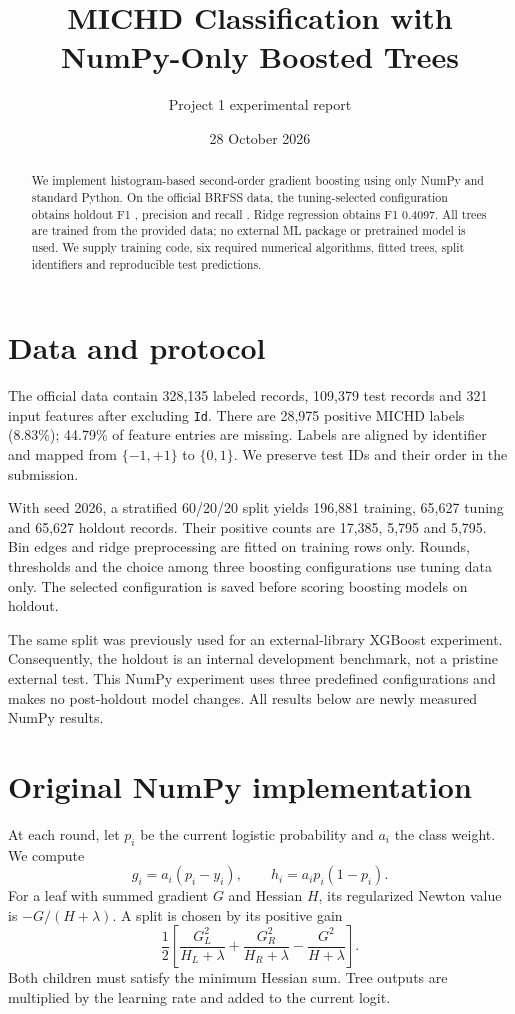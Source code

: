 \documentclass[10pt,a4paper]{article}
\title{\vspace{-1cm}MICHD Classification with NumPy-Only Boosted Trees}
\author{Project 1 experimental report}
\date{28 October 2026}
\begin{document}
\maketitle
\vspace{-0.5cm}
\begin{abstract}
We implement histogram-based second-order gradient boosting using only NumPy and standard Python. On the official BRFSS data, the tuning-selected configuration obtains holdout F1 \HoldF{}, precision \HoldP{} and recall \HoldR{}. Ridge regression obtains F1 0.4097. All trees are trained from the provided data; no external ML package or pretrained model is used. We supply training code, six required numerical algorithms, fitted trees, split identifiers and reproducible test predictions.
\end{abstract}

\section{Data and protocol}
The official data contain 328,135 labeled records, 109,379 test records and 321 input features after excluding \texttt{Id}. There are 28,975 positive MICHD labels (8.83\%); 44.79\% of feature entries are missing. Labels are aligned by identifier and mapped from $\{-1,+1\}$ to $\{0,1\}$. We preserve test IDs and their order in the submission.

With seed 2026, a stratified 60/20/20 split yields 196,881 training, 65,627 tuning and 65,627 holdout records. Their positive counts are 17,385, 5,795 and 5,795. Bin edges and ridge preprocessing are fitted on training rows only. Rounds, thresholds and the choice among three boosting configurations use tuning data only. The selected configuration is saved before scoring boosting models on holdout.

The same split was previously used for an external-library XGBoost experiment. Consequently, the holdout is an internal development benchmark, not a pristine external test. This NumPy experiment uses three predefined configurations and makes no post-holdout model changes. All results below are newly measured NumPy results.

\section{Original NumPy implementation}
At each round, let $p_i$ be the current logistic probability and $a_i$ the class weight. We compute
\[
g_i=a_i(p_i-y_i),\qquad h_i=a_i p_i(1-p_i).
\]
For a leaf with summed gradient $G$ and Hessian $H$, its regularized Newton value is $-G/(H+\lambda)$. A split is chosen by its positive gain
\[
\frac{1}{2}\left[\frac{G_L^2}{H_L+\lambda}
+\frac{G_R^2}{H_R+\lambda}
-\frac{G^2}{H+\lambda}\right].
\]
Both children must satisfy the minimum Hessian sum. Tree outputs are multiplied by the learning rate and added to the current logit.
\end{document}
